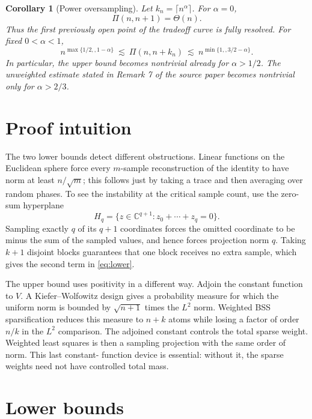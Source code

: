 \documentclass[11pt]{article}
\newtheorem{corollary}[theorem]{Corollary}
\newcommand{\C}{\mathbb C}
\begin{document}
\begin{corollary}[Power oversampling]\label{cor:alpha}
Let $k_n=\lceil n^\alpha\rceil$.  For $\alpha=0$,
\[
 \Pi(n,n+1)=\Theta(n).
\]
Thus the first previously open point of the tradeoff curve is fully
resolved.  For fixed $0<\alpha<1$,
\begin{equation}\label{eq:power-bracket}
 n^{\max\{1/2,,1-\alpha\}}
 \ \lesssim\ \Pi(n,n+k_n)
 \ \lesssim\
 n^{\min\{1,,3/2-\alpha\}}.
\end{equation}
In particular, the upper bound becomes nontrivial already for
$\alpha>1/2$.  The unweighted estimate stated in Remark 7 of the source
paper becomes nontrivial only for $\alpha>2/3$.
\end{corollary}

\section{Proof intuition}

The two lower bounds detect different obstructions.  Linear functions on
the Euclidean sphere force every $m$-sample reconstruction of the identity
to have norm at least $n/\sqrt m$; this follows just by taking a trace and
then averaging over random phases.  To see the instability at the critical
sample count, use the zero-sum hyperplane
\[
 H_q=\{z\in\C^{q+1}:z_0+\cdots+z_q=0\}.
\]
Sampling exactly $q$ of its $q+1$ coordinates forces the omitted coordinate
to be minus the sum of the sampled values, and hence forces projection norm
$q$.  Taking $k+1$ disjoint blocks guarantees that one block receives no
extra sample, which gives the second term in \eqref{eq:lower}.

The upper bound uses positivity in a different way.  Adjoin the constant
function to $V$.  A Kiefer--Wolfowitz design gives a probability measure for
which the uniform norm is bounded by $\sqrt{n+1}$ times the $L^2$ norm.
Weighted BSS sparsification reduces this measure to $n+k$ atoms while
losing a factor of order $n/k$ in the $L^2$ comparison.  The adjoined
constant controls the total sparse weight.  Weighted least squares is then
a sampling projection with the same order of norm.  This last constant-
function device is essential: without it, the sparse weights need not have
controlled total mass.

\section{Lower bounds}
\end{document}
